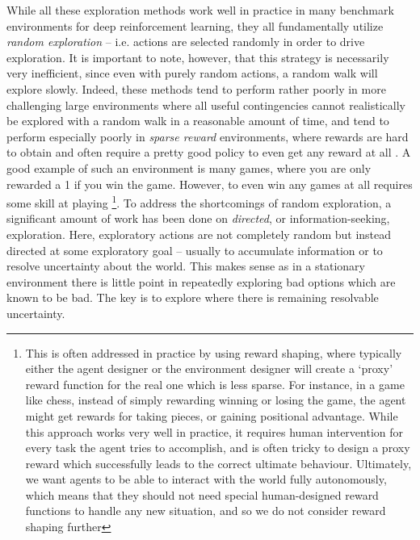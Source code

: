 While all these exploration methods work well in practice in many benchmark environments for deep reinforcement learning, they all fundamentally utilize \emph{random exploration} -- i.e. actions are selected randomly in order to drive exploration. It is important to note, however, that this strategy is necessarily very inefficient, since even with purely random actions, a random walk will explore slowly. Indeed, these methods tend to perform rather poorly in more challenging large environments where all useful contingencies cannot realistically be explored with a random walk in a reasonable amount of time, and tend to perform especially poorly in \emph{sparse reward} environments, where rewards are hard to obtain and often require a pretty good policy to even get any reward at all \citep{tschantz2020reinforcement}. A good example of such an environment is many games, where you are only rewarded a 1 if you win the game. However, to even win any games at all requires some skill at playing \footnote{This is often addressed in practice by using reward shaping, where typically either the agent designer or the environment designer will create a `proxy' reward function for the real one which is less sparse. For instance, in a game like chess, instead of simply rewarding winning or losing the game, the agent might get rewards for taking pieces, or gaining positional advantage. While this approach works very well in practice, it requires human intervention for every task the agent tries to accomplish, and is often tricky to design a proxy reward which successfully leads to the correct ultimate behaviour. Ultimately, we want agents to be able to interact with the world fully autonomously, which means that they should not need special human-designed reward functions to handle any new situation, and so we do not consider reward shaping further}. To address the shortcomings of random exploration, a significant amount of work has been done on \emph{directed}, or information-seeking, exploration. Here, exploratory actions are not completely random but instead directed at some exploratory goal -- usually to accumulate information or to resolve uncertainty about the world. This makes sense as in a stationary environment there is little point in repeatedly exploring bad options which are known to be bad. The key is to explore where there is remaining resolvable uncertainty. 

